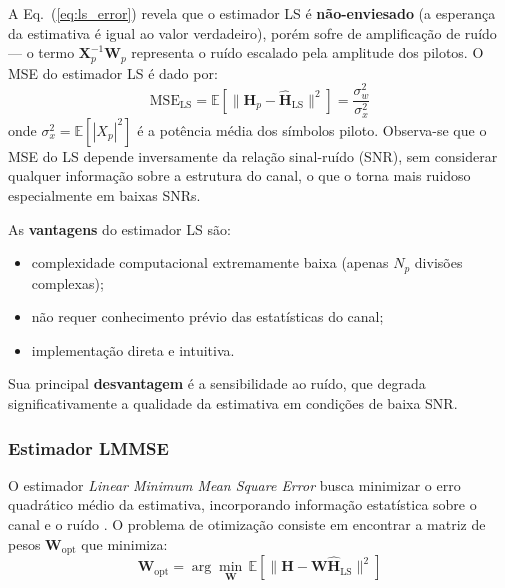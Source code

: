 \documentclass[conference]{IEEEtran}
\begin{document}
A Eq.~(\ref{eq:ls_error}) revela que o estimador LS é \textbf{não-enviesado} (a esperança da estimativa é igual ao valor verdadeiro), porém sofre de amplificação de ruído --- o termo $\mathbf{X}_p^{-1} \mathbf{W}_p$ representa o ruído escalado pela amplitude dos pilotos. O MSE do estimador LS é dado por:
\begin{equation}
    \text{MSE}_{\text{LS}} = \mathbb{E}\!\left[\|\mathbf{H}_p - \hat{\mathbf{H}}_{\text{LS}}\|^2\right] = \frac{\sigma_w^2}{\sigma_x^2}
    \label{eq:mse_ls}
\end{equation}
onde $\sigma_x^2 = \mathbb{E}[|X_p|^2]$ é a potência média dos símbolos piloto. Observa-se que o MSE do LS depende inversamente da relação sinal-ruído (SNR), sem considerar qualquer informação sobre a estrutura do canal, o que o torna mais ruidoso especialmente em baixas SNRs.

As \textbf{vantagens} do estimador LS são:
\begin{itemize}
    \item complexidade computacional extremamente baixa (apenas $N_p$ divisões complexas);
    \item não requer conhecimento prévio das estatísticas do canal;
    \item implementação direta e intuitiva.
\end{itemize}

Sua principal \textbf{desvantagem} é a sensibilidade ao ruído, que degrada significativamente a qualidade da estimativa em condições de baixa SNR.

\subsubsection{Estimador LMMSE}

O estimador \textit{Linear Minimum Mean Square Error} busca minimizar o erro quadrático médio da estimativa, incorporando informação estatística sobre o canal e o ruído \cite{vanDeBeek1995, edfors1998}. O problema de otimização consiste em encontrar a matriz de pesos $\mathbf{W}_{\text{opt}}$ que minimiza:
\begin{equation}
    \mathbf{W}_{\text{opt}} = \arg\min_{\mathbf{W}} \, \mathbb{E}\!\left[\|\mathbf{H} - \mathbf{W}\hat{\mathbf{H}}_{\text{LS}}\|^2\right]
    \label{eq:lmmse_opt}
\end{equation}
\end{document}
